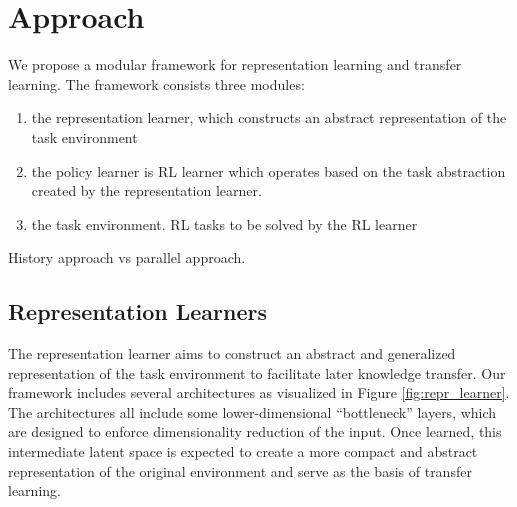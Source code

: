 \section{Approach}
\label{sec:approach}
We propose a modular framework for representation learning and transfer learning. 
The framework consists three modules: 
\begin{enumerate}
	\item the representation learner, which constructs an abstract representation of the task environment
	\item the policy learner is RL learner which operates based on the task abstraction created by the representation learner. 
	\item the task environment. RL tasks to be solved by the RL learner
\end{enumerate}

History approach vs parallel approach.


\subsection{Representation Learners}
The representation learner aims to construct an abstract and generalized representation of the task environment to facilitate later knowledge transfer.
Our framework includes several architectures as visualized in Figure \ref{fig:repr_learner}.
The architectures all include some lower-dimensional ``bottleneck'' layers, 
which are designed to enforce dimensionality reduction of the input.
Once learned, this intermediate latent space is expected to create a more compact and abstract representation of the original environment and serve as the basis of transfer learning. 

